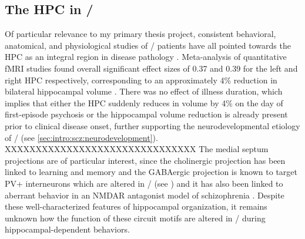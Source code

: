 \subsection{The \acl{HPC} in \scz/}
\label{sec:intro:scz:hpc}
Of particular relevance to my primary thesis project, consistent behavioral, anatomical, and physiological studies of \scz/ patients have all pointed towards the \ac{HPC} as an integral region in disease pathology \citep{Boyer2007, Bogerts1985, Jakob1986}.
Meta-analysis of quantitative \ac{fMRI} studies found overall significant effect sizes of 0.37 and 0.39 for the left and right \ac{HPC} respectively, corresponding to an approximately 4\% reduction in bilateral hippocampal volume \citep{Nelson1998}.
There was no effect of illness duration, which implies that either the \ac{HPC} suddenly reduces in volume by 4\% on the day of first-episode psychosis or the hippocampal volume reduction is already present prior to clinical disease onset, further supporting the neurodevelopmental etiology of \scz/ (see \autoref{sec:intro:scz:neurodevelopment}). 
XXXXXXXXXXXXXXXXXXXXXXXXXXXXXXX
The medial septum projections are of particular interest, since the cholinergic projection has been linked to learning and memory \citep{Parent2004} and the GABAergic projection is known to target PV+ interneurons \citep{Freund1988} which are altered in \scz/ (see ) and it has also been linked to aberrant behavior in an NMDAR antagonist model of schizophrenia \citep{Ma2012}.
Despite these well-characterized features of hippocampal organization, it remains unknown how the function of these circuit motifs are altered in \scz/ during hippocampal-dependent behaviors.

